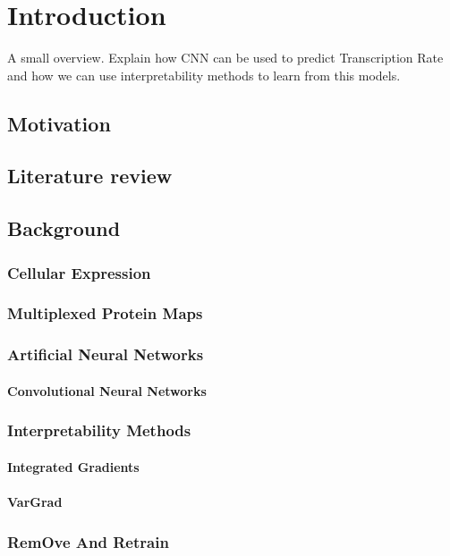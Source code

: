 \chapter{Introduction}
\label{ch:introduction}

A small overview. Explain how CNN can be used to predict Transcription Rate and how we can use interpretability methods to learn from this models.

\section{Motivation}
\label{sec:intro:motivation}

\section{Literature review}
\label{sec:intro:literature_review}

\section{Background}
\label{sec:intro:background}

\subsection{Cellular Expression}
\label{sec:intro:cellular_expression}

\subsection{Multiplexed Protein Maps}
\label{sec:intro:multiplexed_protein_maps}



\subsection{Artificial Neural Networks}
\label{sec:intro:Cellular_Expression}


\subsubsection{Convolutional Neural Networks}
\label{sec:intro:CNN}


\subsection{Interpretability Methods}
\label{sec:intro:interpretability_methods}


\subsubsection{Integrated Gradients}
\label{sec:intro:IG}


\subsubsection{VarGrad}
\label{sec:intro:VarGrad}


\subsection{RemOve And Retrain}
\label{sec:intro:ROAR}


